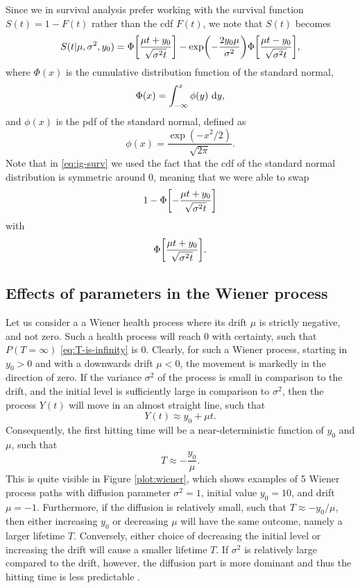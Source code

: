 Since we in survival analysis prefer working with the survival function $S(t)=1-F(t)$ rather than the cdf $F(t)$, we note that $S(t)$ becomes
\begin{equation}
\label{eq:ig-surv}
    S(t|\mu,\sigma^2,y_0)=\Phi\sqb*{\frac{\mu t+y_0}{\sqrt{\sigma^2t}}}-\exp\p*{-\frac{2y_0\mu}{\sigma^2}}\Phi\sqb*{\frac{\mu t-y_0}{\sqrt{\sigma^2t}}},
\end{equation}
where $\Phi(x)$ is the cumulative distribution function of the standard normal,
\begin{equation*}
    \Phi(x)=\int_{-\infty}^x\phi(y)\text{~d}y,
\end{equation*}
and $\phi(x)$ is the pdf of the standard normal, defined as
\begin{equation*}
    \phi(x)=\frac{\exp\left(-x^2/2\right)}{\sqrt{2\pi}}.
\end{equation*}
Note that in \eqref{eq:ig-surv} we used the fact that the cdf of the standard normal distribution is symmetric around 0,
meaning that we were able to swap
\begin{equation*}
    1-\Phi\sqb*{-\frac{\mu t+y_0}{\sqrt{\sigma^2t}}}
\end{equation*}
with
\begin{equation*}
    \Phi\sqb*{\frac{\mu t+y_0}{\sqrt{\sigma^2t}}}.
\end{equation*}

\subsection{Effects of parameters in the Wiener process}
Let us consider a a Wiener health process where its drift $\mu$ is strictly negative, and not zero.
Such a health process will reach 0 with certainty, such that $P(T=\infty)$ \eqref{eq:T-is-infinity} is 0.
Clearly, for such a Wiener process, starting in $y_0>0$ and with a downwards drift $\mu<0$, the movement is markedly in the direction of zero.
If the variance $\sigma^2$ of the process is small in comparison to the drift, and the initial level is sufficiently large in comparison to $\sigma^2$, then the process $Y(t)$ will move in an almost straight line, such that
\begin{equation*}
    Y(t)\approx y_0+\mu t.
\end{equation*}
Consequently, the first hitting time will be a near-deterministic function of $y_0$ and $\mu$, such that
\begin{equation*}
    T\approx -\frac{y_0}{\mu}.
\end{equation*}
This is quite visible in Figure \ref{plot:wiener}, which shows examples of 5 Wiener process paths with diffusion parameter $\sigma^2=1$, initial value $y_0=10$, and drift $\mu=-1$.
Furthermore, if the diffusion is relatively small, such that $T\approx -y_0/\mu$, then either increasing $y_0$ or decreasing $\mu$ will have the same outcome, namely a larger lifetime $T$.
Conversely, either choice of decreasing the initial level or increasing the drift will cause a smaller lifetime $T$.
If $\sigma^2$ is relatively large compared to the drift, however, the diffusion part is more dominant and thus the hitting time is less predictable \citep{ABG}.

